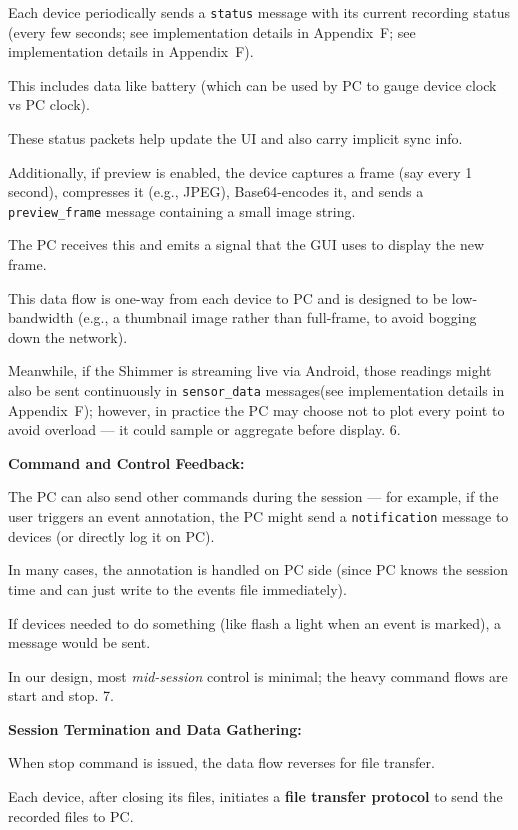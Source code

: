Each device periodically sends a \texttt{status} message with its current recording
status (every few seconds; see implementation details in Appendix~F; see
implementation details in Appendix~F).

This includes data like battery %
(which can be used by PC to gauge device clock vs PC clock).

These status packets help update the UI and also carry implicit sync info.

Additionally, if preview is enabled, the device captures a frame (say every 1
second), compresses it (e.g., JPEG), Base64-encodes it, and sends a
\texttt{preview\_frame} message containing a small image string.

The PC receives this and emits a signal that the GUI uses to display the new frame.

This data flow is one-way from each device to PC and is designed to be low-bandwidth
(e.g., a thumbnail image rather than full-frame, to avoid bogging down the network).

Meanwhile, if the Shimmer is streaming live via Android, those readings might also be
sent continuously in \texttt{sensor\_data} messages(see implementation details in
Appendix~F); however, in practice the PC may choose not to plot every point to avoid
overload --- it could sample or aggregate before display.  6.

\textbf{Command and Control Feedback:}

The PC can also send other commands during the session --- for example, if the user
triggers an event annotation, the PC might send a \texttt{notification} message to
devices (or directly log it on PC).

In many cases, the annotation is handled on PC side (since PC knows the session time
and can just write to the events file immediately).

If devices needed to do something (like flash a light when an event is marked), a
message would be sent.

In our design, most \textit{mid-session} control is minimal; the heavy command flows
are start and stop.  7.

\textbf{Session Termination and Data Gathering:}

When stop command is issued, the data flow reverses for file transfer.

Each device, after closing its files, initiates a \textbf{file transfer protocol}
 to send the recorded files to PC.

